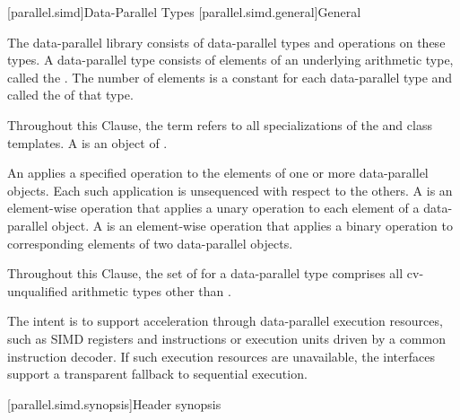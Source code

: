 
[parallel.simd]{Data-Parallel Types}
[parallel.simd.general]{General}

\pnum
The data-parallel library consists of data-parallel types and operations on these types. A data-parallel type consists of elements of an underlying arithmetic type, called the . The number of elements is a constant for each data-parallel type and called the  of that type.

\pnum
Throughout this Clause, the term  refers to all   specializations of the  and  class templates. A  is an object of .

\pnum
An  applies a specified operation to the elements of one or more data-parallel objects. Each such application is unsequenced with respect to the others. A  is an element-wise operation that applies a unary operation to each element of a data-parallel object. A  is an element-wise operation that applies a binary operation to corresponding elements of two data-parallel objects.

\pnum
Throughout this Clause, the set of  for a data-parallel type comprises all cv-unqualified arithmetic types other than .

\pnum
\begin{note}
The intent is to support acceleration through data-parallel execution resources, such as SIMD registers and instructions or execution units driven by a common instruction decoder. If such execution resources are unavailable, the interfaces support a transparent fallback to sequential execution.
\end{note}

[parallel.simd.synopsis]{Header  synopsis}

